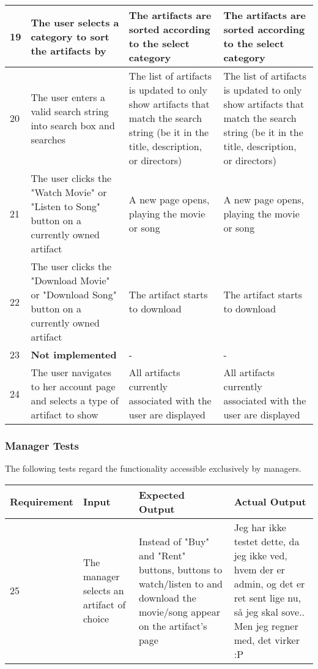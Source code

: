 {{\begin{tabular}{ | p{2cm} | p{3cm} | p{4cm} | p{4cm} | }
	\hline
	19 & The user selects a category to sort the artifacts by & The artifacts are sorted according to the select category & The artifacts are sorted according to the select category \\
	\hline
	20 & The user enters a valid search string into search box and searches & The list of artifacts is updated to only show artifacts that match the search string (be it in the title, description, or directors) & The list of artifacts is updated to only show artifacts that match the search string (be it in the title, description, or directors) \\
	\hline
	21 & The user clicks the "Watch Movie" or "Listen to Song" button on a currently owned artifact & A new page opens, playing the movie or song & A new page opens, playing the movie or song \\
	\hline
	22 & The user clicks the "Download Movie" or "Download Song" button on a currently owned artifact & The artifact starts to download & The artifact starts to download \\
	\hline
	23 & \textbf{Not implemented}  & - & - \\
	\hline
	24 & The user navigates to her account page and selects a type of artifact to show & All artifacts currently associated with the user are displayed & All artifacts currently associated with the user are displayed \\
	\hline
\end{tabular}}}

\subsubsection{Manager Tests}
The following tests regard the functionality accessible exclusively by managers. \\
{\centering
\scalebox{0.7}
{\begin{tabular}{ | p{2cm} | p{3cm} | p{4cm} | p{4cm} | }
	\hline
	Requirement & Input & Expected Output & Actual Output \\
	\hline
	25 & The manager selects an artifact of choice & Instead of "Buy" and "Rent" buttons, buttons to watch/listen to and download the movie/song appear on the artifact's page & Jeg har ikke testet dette, da jeg ikke ved, hvem der er admin, og det er ret sent lige nu, så jeg skal sove.. Men jeg regner med, det virker :P \\
	\hline
\end{tabular}}}